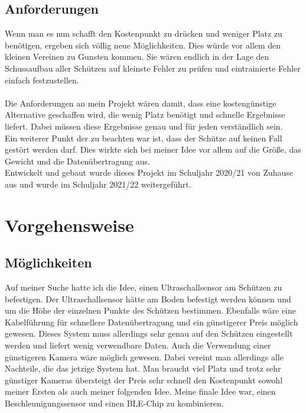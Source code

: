 \subsection{Anforderungen}
Wenn man es nun schafft den Kostenpunkt zu drücken und weniger Platz zu benötigen,
ergeben sich völlig neue Möglichkeiten. Dies würde vor allem den kleinen Vereinen zu Gunsten 
kommen. Sie wären endlich in der Lage den Schussaufbau aller Schützen auf kleinste Fehler 
zu prüfen und eintrainierte Fehler einfach festzustellen.\\
\\
Die Anforderungen an mein Projekt wären damit, dass eine kostengünstige Alternative 
geschaffen wird, die wenig Platz benötigt und schnelle Ergebnisse liefert. Dabei müssen diese 
Ergebnisse genau und für jeden verständlich sein.\\
Ein weiterer Punkt der zu beachten war ist, dass der Schütze auf keinen Fall gestört werden 
darf. Dies wirkte sich bei meiner Idee vor allem auf die Größe, das Gewicht und die 
Datenübertragung aus.\\
Entwickelt und gebaut wurde dieses Projekt im Schuljahr 2020/21 von Zuhause aus und wurde 
im Schuljahr 2021/22 weitergeführt.

\section{Vorgehensweise}
\subsection{Möglichkeiten}
Auf meiner Suche hatte ich die Idee, einen Ultraschallsensor am Schützen zu befestigen. Der 
Ultraschallsensor hätte am Boden befestigt werden können und um die Höhe der einzelnen 
Punkte des Schützen bestimmen. Ebenfalls wäre eine Kabelführung für schnellere 
Datenübertragung und ein günstigerer Preis möglich gewesen. Dieses System muss allerdings 
sehr genau auf den Schützen eingestellt werden und liefert wenig verwendbare Daten.
Auch die Verwendung einer günstigeren Kamera wäre möglich gewesen. Dabei vereint man 
allerdings alle Nachteile, die das jetzige System hat. Man braucht viel Platz und trotz sehr 
günstiger Kameras übersteigt der Preis sehr schnell den Kostenpunkt sowohl meiner Ersten 
als auch meiner folgenden Idee.
Meine finale Idee war, einen Beschleunigungssensor und einen BLE-Chip zu kombinieren.

%

